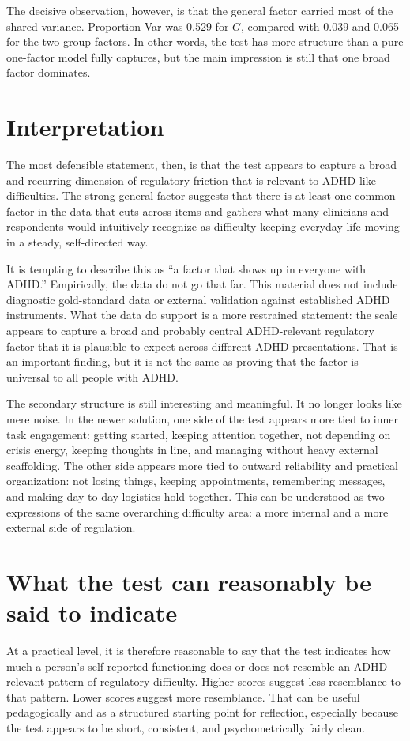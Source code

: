 \documentclass[11pt,a4paper]{article}
\begin{document}
The decisive observation, however, is that the general factor carried most of the shared variance. Proportion Var was 0.529 for $G$, compared with 0.039 and 0.065 for the two group factors. In other words, the test has more structure than a pure one-factor model fully captures, but the main impression is still that one broad factor dominates.

\section{Interpretation}
The most defensible statement, then, is that the test appears to capture a broad and recurring dimension of regulatory friction that is relevant to ADHD-like difficulties. The strong general factor suggests that there is at least one common factor in the data that cuts across items and gathers what many clinicians and respondents would intuitively recognize as difficulty keeping everyday life moving in a steady, self-directed way.

It is tempting to describe this as ``a factor that shows up in everyone with ADHD.'' Empirically, the data do not go that far. This material does not include diagnostic gold-standard data or external validation against established ADHD instruments. What the data do support is a more restrained statement: the scale appears to capture a broad and probably central ADHD-relevant regulatory factor that it is plausible to expect across different ADHD presentations. That is an important finding, but it is not the same as proving that the factor is universal to all people with ADHD.

The secondary structure is still interesting and meaningful. It no longer looks like mere noise. In the newer solution, one side of the test appears more tied to inner task engagement: getting started, keeping attention together, not depending on crisis energy, keeping thoughts in line, and managing without heavy external scaffolding. The other side appears more tied to outward reliability and practical organization: not losing things, keeping appointments, remembering messages, and making day-to-day logistics hold together. This can be understood as two expressions of the same overarching difficulty area: a more internal and a more external side of regulation.

\section{What the test can reasonably be said to indicate}
At a practical level, it is therefore reasonable to say that the test indicates how much a person's self-reported functioning does or does not resemble an ADHD-relevant pattern of regulatory difficulty. Higher scores suggest less resemblance to that pattern. Lower scores suggest more resemblance. That can be useful pedagogically and as a structured starting point for reflection, especially because the test appears to be short, consistent, and psychometrically fairly clean.
\end{document}
